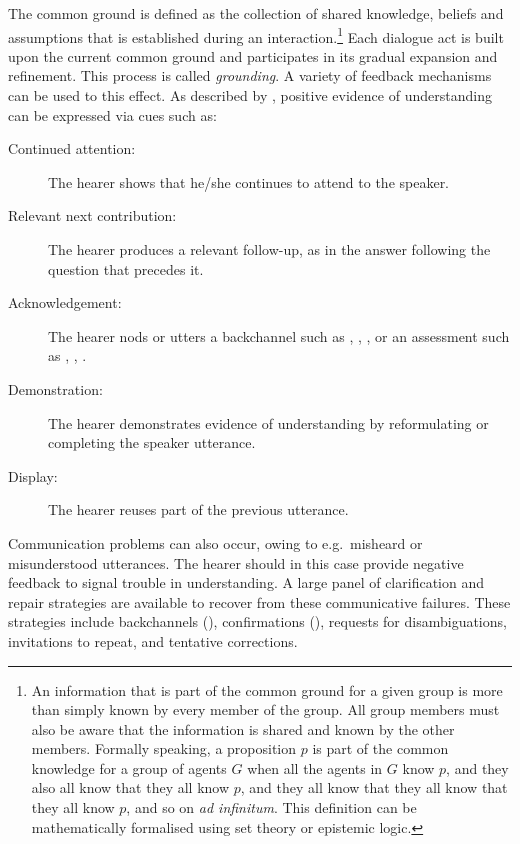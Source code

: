 The common ground is defined as the collection of shared knowledge, beliefs and assumptions that is established during an interaction.\footnote{An information that is part of the common ground for a given group is more than simply known by every member of the group.  All group members must also be aware that the information is shared and known by the other members. Formally speaking, a proposition $p$ is part of the common knowledge for a group of agents $G$ when all the agents in $G$ know $p$, and they also all know that they all know $p$, and they all know that they all know that they all know $p$, and so on \textit{ad infinitum}. This definition can be mathematically formalised using set theory or epistemic logic. } Each dialogue act is built upon the current common ground and participates in its gradual expansion and refinement.  This process is called \textit{grounding}.  A variety of feedback mechanisms  can be used to this effect.  As described by \cite{Clark1989}, positive evidence of understanding can be expressed via cues such as:
\begin{description}
\item[Continued attention: ] The hearer shows that he/she continues to attend to the speaker.
\item[Relevant next contribution: ] The hearer produces a relevant follow-up, as in the answer  following the question that precedes it.
\item [Acknowledgement: ] The hearer nods or utters a backchannel such as , , , or an assessment such as , , .
\item [Demonstration: ] The hearer demonstrates evidence of understanding by reformulating or completing the speaker utterance.
\item [Display: ] The hearer reuses part of the previous utterance.
\end{description}

Communication problems can also occur, owing to e.g.\ misheard or misunderstood utterances. The hearer should in this case provide negative feedback to signal trouble in understanding. A large panel of clarification and repair strategies  are available to recover from these communicative failures.  These strategies include backchannels (), confirmations  (), requests for disambiguations, invitations to repeat, and tentative corrections.  

